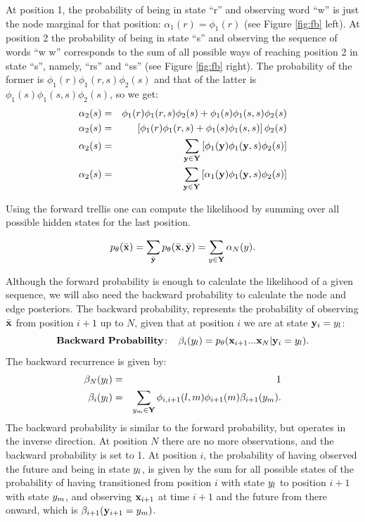 At position 1, the probability of being in state ``r'' and observing word ``w'' is just the node
marginal for that position: $\alpha_1(r) = \phi_1(r)$ (see Figure
 \ref{fig:fb} left). At position 2 the probability
of being in state ``s'' and observing the sequence of words ``w w''
corresponds to the sum of all possible ways of reaching position 2 in
state ``s'', namely, ``rs'' and ``ss'' (see Figure \ref{fig:fb} right). The probability of the former is
$\phi_1(r)\phi_1(r,s)\phi_2(s)$
and that of the latter is $\phi_1(s)\phi_1(s,s)\phi_2(s)$, so we get:
\begin{eqnarray*}
   \alpha_2(s) &=& \phi_1(r)\phi_1(r,s)\phi_2(s) +
   \phi_1(s)\phi_1(s,s)\phi_2(s) \\
   \alpha_2(s) &=& \left[\phi_1(r)\phi_1(r,s) +
   \phi_1(s)\phi_1(s,s) \right]\phi_2(s) \\
 \alpha_2(s) &=& \displaystyle \sum_{\mathbf{y} \in \mathbf{Y}}
 \left[\phi_1(\mathbf{y})\phi_1(\mathbf{y},s)\phi_2(s) \right] \\
  \alpha_2(s) &=& \displaystyle \sum_{\mathbf{y} \in \mathbf{Y}}
 \left[\alpha_1(\mathbf{y})\phi_1(\mathbf{y},s)\phi_2(s) \right]
\end{eqnarray*}

Using the forward trellis one can compute the likelihood by summing
over all possible hidden states for the last position.

\begin{equation}
\label{eq:forwardSum}
p_{\theta}(\bar{\mathbf{x}}) = \displaystyle \sum_{\bar{\mathbf{y}}} p_{\theta}(\bar{\mathbf{x}} ,\bar{\mathbf{y}}) = \displaystyle \sum_{{y} \in \mathbf{Y}} \alpha_N({y}) .
\end{equation}

Although the forward probability is enough to calculate the likelihood
of a given sequence, we will also need the backward probability to
calculate the node and edge posteriors. The backward probability,
represents the probability of observing $\bar{\mathbf{x}}$ from position $i+1$ up to $N$, given that at position $i$ we are at state $\mathbf{y}_i = {y}_l$:
 \begin{equation}
\label{eq::backward}
\mathbf{Backward \ Probability\!:}\;\;\;\;  \beta_i({y}_l) = p_{\theta}(\mathbf{x}_{i+1}...\mathbf{x}_N | \mathbf{y}_i = {y}_l).
\end{equation}
The backward recurrence is given by:
\begin{eqnarray}
\beta_N({y}_l) &=& 1 \\
\beta_i({y}_l) &=& \displaystyle \sum_{{y}_m \in \mathbf{Y}} \phi_{i,i+1}(l,m)\phi_{i+1}(m) \beta_{i+1}({y}_m).
\end{eqnarray}
The backward probability is similar to the forward probability, but operates in the inverse direction.
At position $N$ there are no more observations, and the backward
probability is set to 1. At position $i$, the probability 
of having observed the future and being in state ${y}_l$, is given by the sum for all possible states of the probability of having transitioned 
from position $i$ with state ${y}_l$ to position $i+1$ with state ${y}_m$, and observing $\mathbf{x}_{i+1}$ at time $i+1$ and the future from there onward, which is $\beta_{i+1}(\mathbf{y}_{i+1} = {y}_m)$. 


